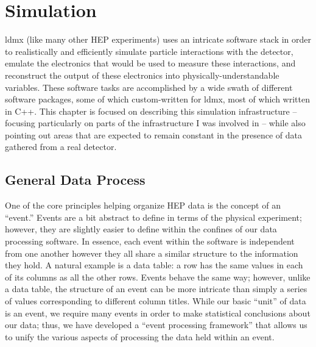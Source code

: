 \chapter{Simulation}
\label{chapter:ldmx:simulation}

\ac{ldmx} (like many other HEP experiments) uses an intricate software stack in order to realistically and efficiently simulate particle interactions with the detector, emulate the electronics that would be used to measure these interactions, and reconstruct the output of these electronics into physically-understandable variables.
These software tasks are accomplished by a wide swath of different software packages, some of which custom-written for \ac{ldmx}, most of which written in C++.
This chapter is focused on describing this simulation infrastructure -- focusing particularly on parts of the infrastructure I was involved in -- while also pointing out areas that are expected to remain constant in the presence of data gathered from a real detector.

\section{General Data Process}
One of the core principles helping organize HEP data is the concept of an ``event.''
Events are a bit abstract to define in terms of the physical experiment; however, they are slightly easier to define within the confines of our data processing software.
In essence, each event within the software is independent from one another however they all share a similar structure to the information they hold. A natural example is a data table: a row has the same values in each of its columns as all the other rows. Events behave the same way; however, unlike a data table, the structure of an event can be more intricate than simply a series of values corresponding to different column titles.
While our basic ``unit'' of data is an event, we require many events in order to make statistical conclusions about our data; thus, we have developed a ``event processing framework'' that allows us to unify the various aspects of processing the data held within an event.

